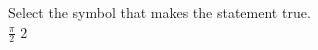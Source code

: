 \documentclass{ximera}
\author{David Kish}
\begin{document}
\begin{exercise}
Select the symbol that makes the statement true.\\
$\frac{\pi}{2}$ \wordChoice{\choice[correct]{$<$}\choice{$>$}\choice{$=$}} $2$ 

\end{exercise}
\end{document}

